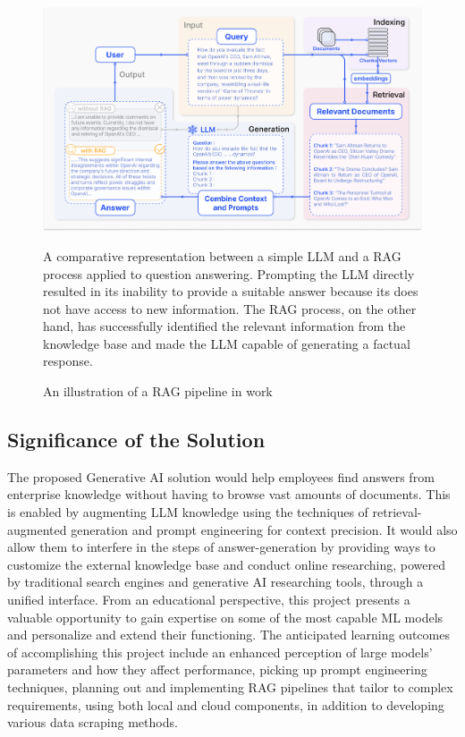 \begin{figure}[H]
    \centering
    \includegraphics[width=\linewidth]{./figures/RAG_case.png}
    \caption{An illustration of a RAG pipeline in work \cite{ragforllmsasurvey}}
    \begin{flushleft}
        \small A comparative representation between a simple LLM and a RAG process applied to question answering. Prompting the LLM directly resulted in its inability to provide a suitable answer because its does not have access to new information. The RAG process, on the other hand, has successfully identified the relevant information from the knowledge base and made the LLM capable of generating a factual response.
    \end{flushleft}
\end{figure}
\subsection{Significance of the Solution}
The proposed Generative AI solution would help employees find answers from enterprise knowledge without having to browse vast amounts of documents. This is enabled by augmenting LLM knowledge using the techniques of retrieval-augmented generation and prompt engineering for context precision. It would also allow them to interfere in the steps of answer-generation by providing ways to customize the external knowledge base and conduct online researching, powered by traditional search engines and generative AI researching tools, through a unified interface.\medskip\newline
From an educational perspective, this project presents a valuable opportunity to gain expertise on some of the most capable ML models and personalize and extend their functioning. The anticipated learning outcomes of accomplishing this project include an enhanced perception of large models' parameters and how they affect performance, picking up prompt engineering techniques, planning out and implementing RAG pipelines that tailor to complex requirements, using both local and cloud components, in addition to developing various data scraping methods.


